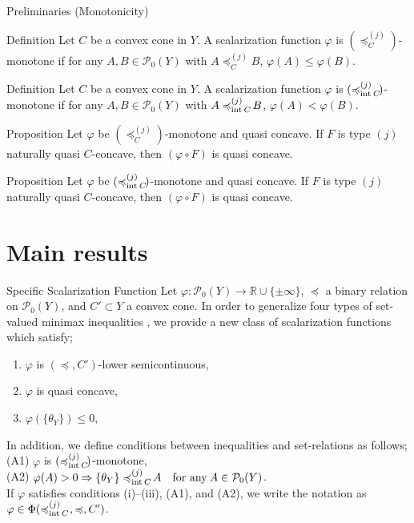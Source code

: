 \documentclass[aspectratio=169, dvipdfmx, 11pt]{beamer}
\newcommand{\RealNumberSet}{\mathbb{R}}
\newcommand{\Interior}[1]{\text{\rm int\:${#1}$}} %
\newcommand{\pow}[1]{\mathcal{P}_{0}(#1)}
\newcommand{\setrel}[2]{\preccurlyeq^{(#1)}_{#2}\!}
\begin{document}
\begin{frame}{Preliminaries (Monotonicity)}
  \begin{block}{Definition}
    Let $C$ be a convex cone in $Y$.
    A scalarization function $\varphi$ is $(\setrel{j}{C})$-monotone if
    for any $A, B \in \pow{Y}$ with
    $A \setrel{j}{C} B$, $\varphi (A) \leq \varphi (B)$.
  \end{block}

  \begin{block}{Definition}
    Let $C$ be a convex cone in $Y$.
    A scalarization function $\varphi$ is $(\setrel{j}{\Interior{C}})$-monotone if
    for any $A, B \in \pow{Y}$ with
    $A \setrel{j}{\Interior{C}} B$, $\varphi (A) < \varphi (B)$.
  \end{block}

  \begin{block}{Proposition}
    Let $\varphi$ be $(\setrel{j}{C})$-monotone and quasi concave.
    If $F$ is type $(j)$ naturally quasi $C$-concave,
    then $(\varphi \circ F)$ is quasi concave.
  \end{block}

  \begin{block}{Proposition}
    Let $\varphi$ be $(\setrel{j}{\Interior{C}})$-monotone and quasi concave.
    If $F$ is type $(j)$ naturally quasi $C$-concave,
    then $(\varphi \circ F)$ is quasi concave.
  \end{block}
\end{frame}

\section{Main results}

\begin{frame}{Specific Scalarization Function}
  Let $\varphi: \pow{Y} \to \RealNumberSet \cup \{\pm \infty\}$, $\preccurlyeq$ a binary relation
  on $\pow{Y}$, and $C' \subset Y$  a convex cone.
  In order to generalize four types of set-valued minimax inequalities \cite{MR2778674},
  we provide a new class of scalarization functions which satisfy;
  \begin{enumerate}
    \item $\varphi$ is $(\preccurlyeq, C')$-lower semicontinuous,
    \item $\varphi$ is quasi concave,
    \item $\varphi(\{\theta_{Y}\}) \leq 0$,
  \end{enumerate}
  In addition, we define conditions between inequalities and set-relations as follows;\\
  \vspace{2mm}
  (A1) $\varphi$ is $(\setrel{j}{\Interior{C}})$-monotone,\\
  (A2) $\varphi (A) > 0 \Rightarrow  \{\theta_Y\} \setrel{j}{\Interior{C}} A \quad\text{for any}\:A \in \pow{Y}$.\\
  \vspace{2mm}
  If $\varphi$ satisfies conditions (i)--(iii), (A1), and (A2),
  we write the notation as $\varphi \in \Phi(\setrel{j}{\Interior{C}}\:, \preccurlyeq, C')$.
\end{frame}
\end{document}
